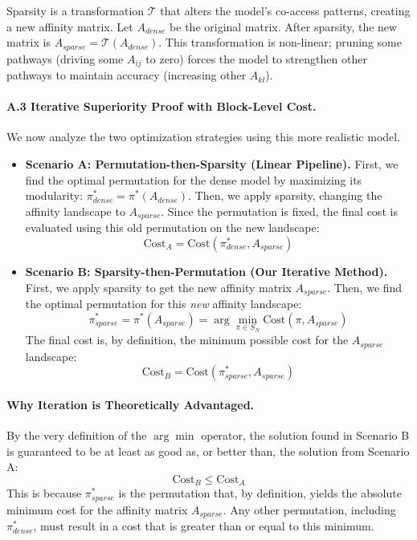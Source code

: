 \documentclass{article}
\begin{document}
Sparsity is a transformation $\mathcal{T}$ that alters the model's co-access patterns, creating a new affinity matrix. Let $A_{dense}$ be the original matrix. After sparsity, the new matrix is $A_{sparse} = \mathcal{T}(A_{dense})$. This transformation is non-linear; pruning some pathways (driving some $A_{ij}$ to zero) forces the model to strengthen other pathways to maintain accuracy (increasing other $A_{kl}$).

\paragraph{A.3 Iterative Superiority Proof with Block-Level Cost.}
We now analyze the two optimization strategies using this more realistic model.

\begin{itemize}
    \item \textbf{Scenario A: Permutation-then-Sparsity (Linear Pipeline).}
    First, we find the optimal permutation for the dense model by maximizing its modularity: $\pi^*_{dense} = \pi^*(A_{dense})$. Then, we apply sparsity, changing the affinity landscape to $A_{sparse}$. Since the permutation is fixed, the final cost is evaluated using this old permutation on the new landscape:
    \begin{equation}
        \text{Cost}_A = \text{Cost}(\pi^*_{dense}, A_{sparse})
    \end{equation}

    \item \textbf{Scenario B: Sparsity-then-Permutation (Our Iterative Method).}
    First, we apply sparsity to get the new affinity matrix $A_{sparse}$. Then, we find the optimal permutation for this \textit{new} affinity landscape:
    \begin{equation}
        \pi^*_{sparse} = \pi^*(A_{sparse}) = \arg\min_{\pi \in S_N} \text{Cost}(\pi, A_{sparse})
    \end{equation}
    The final cost is, by definition, the minimum possible cost for the $A_{sparse}$ landscape:
    \begin{equation}
        \text{Cost}_B = \text{Cost}(\pi^*_{sparse}, A_{sparse})
    \end{equation}
\end{itemize}

\paragraph{Why Iteration is Theoretically Advantaged.}
By the very definition of the $\arg\min$ operator, the solution found in Scenario B is guaranteed to be at least as good as, or better than, the solution from Scenario A:
\begin{equation}
\label{eq:inequality}
\text{Cost}_B \leq \text{Cost}_A
\end{equation}
This is because $\pi^*_{sparse}$ is the permutation that, by definition, yields the absolute minimum cost for the affinity matrix $A_{sparse}$. Any other permutation, including $\pi^*_{dense}$, must result in a cost that is greater than or equal to this minimum.
\end{document}
